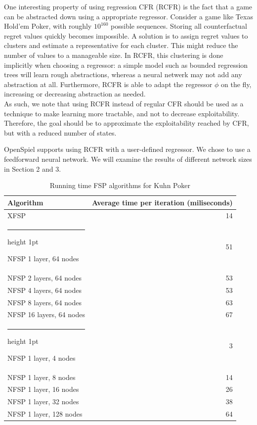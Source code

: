 \documentclass[10pt,a4paper]{article}
\makeatletter
\newcommand{\thickhline}{%
    \noalign {\ifnum 0=`}\fi \hrule height 1pt
    \futurelet \reserved@a \@xhline
}
\makeatother
\begin{document}
One interesting property of using regression CFR (RCFR) is the fact that a game can be abstracted down using a appropriate regressor. Consider a game like Texas Hold'em Poker, with roughly $10^{160}$ possible sequences. Storing all counterfactual regret values quickly becomes impossible. A solution is to assign regret values to clusters and estimate a representative for each cluster. This might reduce the number of values to a manageable size. In RCFR, this clustering is done implicitly when choosing a regressor: a simple model such as bounded regression trees will learn rough abstractions, whereas a neural netwerk may not add any abstraction at all. Furthermore, RCFR is able to adapt the regressor $\phi$ on the fly, increasing or decreasing abstraction as needed.\\

As such, we note that using RCFR instead of regular CFR should be used as a technique to make learning more tractable, and not to decrease exploitability. Therefore, the goal should be to approximate the exploitability reached by CFR, but with a reduced number of states.

OpenSpiel supports using RCFR with a user-defined regressor. We chose to use a feedforward neural network. We will examine the results of different network sizes in Section 2 and 3.

\begin{table}
\begin{center}
\begin{tabular}{|l|r|}
\hline 
Algorithm & Average time per iteration (miliseconds) \\
\hline 
XFSP & 14 \\ 
\thickhline 
NFSP 1 layer, 64 nodes & 51 \\ 
\hline 
NFSP 2 layers, 64 nodes  & 53 \\ 
\hline 
NFSP 4 layers, 64 nodes & 53 \\ 
\hline 
NFSP 8 layers, 64 nodes & 63 \\ 
\hline 
NFSP 16 layers, 64 nodes & 67 \\ 
\thickhline
NFSP 1 layer, 4 nodes & 3 \\ 
\hline 
NFSP 1 layer, 8 nodes & 14 \\ 
\hline 
NFSP 1 layer, 16 nodes & 26 \\ 
\hline 
NFSP 1 layer, 32 nodes & 38 \\ 
\hline 
NFSP 1 layer, 128 nodes & 64 \\ 
\hline 
\end{tabular}
\caption{Running time FSP algorithms for Kuhn Poker}
\end{center}
\end{table} 
\end{document}
